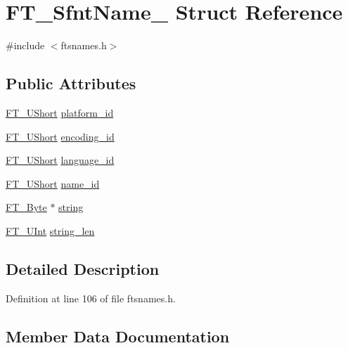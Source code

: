 \hypertarget{struct_f_t___sfnt_name__}{}\section{F\+T\+\_\+\+Sfnt\+Name\+\_\+ Struct Reference}
\label{struct_f_t___sfnt_name__}


{\ttfamily \#include $<$ftsnames.\+h$>$}

\subsection*{Public Attributes}
\begin{DoxyCompactItemize}
\item 
\mbox{\hyperlink{fttypes_8h_a937f6c17cf5ffd09086d8610c37b9f58}{F\+T\+\_\+\+U\+Short}} \mbox{\hyperlink{struct_f_t___sfnt_name___ae92450a058eb4737df85f66226d69f43}{platform\+\_\+id}}
\item 
\mbox{\hyperlink{fttypes_8h_a937f6c17cf5ffd09086d8610c37b9f58}{F\+T\+\_\+\+U\+Short}} \mbox{\hyperlink{struct_f_t___sfnt_name___a01f4573605eab3f4d2e4b9b50b0de98f}{encoding\+\_\+id}}
\item 
\mbox{\hyperlink{fttypes_8h_a937f6c17cf5ffd09086d8610c37b9f58}{F\+T\+\_\+\+U\+Short}} \mbox{\hyperlink{struct_f_t___sfnt_name___a6fb23e0f299a97b25b63805b04cf1fc5}{language\+\_\+id}}
\item 
\mbox{\hyperlink{fttypes_8h_a937f6c17cf5ffd09086d8610c37b9f58}{F\+T\+\_\+\+U\+Short}} \mbox{\hyperlink{struct_f_t___sfnt_name___ac07be3e852408990fe0a910f00b68f4e}{name\+\_\+id}}
\item 
\mbox{\hyperlink{fttypes_8h_a51f26183ca0c9f4af958939648caeccd}{F\+T\+\_\+\+Byte}} $\ast$ \mbox{\hyperlink{struct_f_t___sfnt_name___ab369e2c3d8dc9662f69c53e4d3158067}{string}}
\item 
\mbox{\hyperlink{fttypes_8h_abcb8db4dbf35d2b55a9e8c7b0926dc52}{F\+T\+\_\+\+U\+Int}} \mbox{\hyperlink{struct_f_t___sfnt_name___a4ebdb7207b5681d16f9cc17f432cb56f}{string\+\_\+len}}
\end{DoxyCompactItemize}


\subsection{Detailed Description}


Definition at line 106 of file ftsnames.\+h.



\subsection{Member Data Documentation}
\mbox{\label{struct_f_t___sfnt_name___a01f4573605eab3f4d2e4b9b50b0de98f}} 
